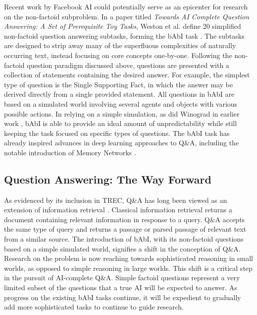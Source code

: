 Recent work by Facebook AI could potentially serve as an epicenter for research on the non-factoid subproblem. In a paper titled \textit{Towards AI Complete Question Answering: A Set of Prerequisite Toy Tasks}, Weston et al. define 20 simplified non-factoid question answering subtasks, forming the bAbI task \cite{weston2015towards}. The subtasks are designed to strip away many of the superfluous complexities of naturally occurring text, instead focusing on core concepts one-by-one. Following the non-factoid question paradigm discussed above, questions are presented with a collection of statements containing the desired answer. For example, the simplest type of question is the Single Supporting Fact, in which the answer may be derived directly from a single provided statement. All questions in bAbI are based on a simulated world involving several agents and objects with various possible actions. In relying on a simple simulation, as did Winograd in earlier work \cite{winograd1971procedures}, bAbI is able to provide an ideal amount of unpredictability while still keeping the task focused on specific types of questions. The bAbI task has already inspired advances in deep learning approaches to Q\&A, including the notable introduction of Memory Networks \cite{sukhbaatar2015weakly}.

\subsection{Question Answering: The Way Forward}

As evidenced by its inclusion in TREC, Q\&A has long been viewed as an extension of information retrieval \cite{kolomiyets2011survey}. Classical information retrieval returns a document containing relevant information in response to a query. Q\&A accepts the same type of query and returns a passage or parsed passage of relevant text from a similar source. The introduction of bAbI, with its non-factoid questions based on a simple simulated world, signifies a shift in the conception of Q\&A. Research on the problem is now reaching towards sophisticated reasoning in small worlds, as opposed to simple reasoning in large worlds. This shift is a critical step in the pursuit of AI-complete Q\&A. Simple factoid questions represent a very limited subset of the questions that a true AI will be expected to answer. As progress on the existing bAbI tasks continue, it will be expedient to gradually add more sophisticated tasks to continue to guide research.

